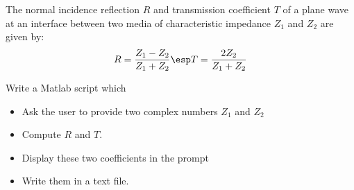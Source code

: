 \bexo


The normal incidence reflection $R$ and transmission coefficient $T$ of a plane wave at an interface between two media of characteristic impedance $Z_1$ and $Z_2$ are given by: 
\begin{equation}
	R=\dfrac{Z_1-Z_2}{Z_1+Z_2}\esp T=\dfrac{2Z_2}{Z_1+Z_2}
\end{equation}

Write a Matlab script which 
\begin{itemize}
\item Ask the user to provide two complex numbers $Z_1$ and $Z_2$
\item Compute $R$ and $T$.
\item Display these two coefficients in the prompt
\item Write them in a text file.
\end{itemize}
 
\eexo
\solution{
}
